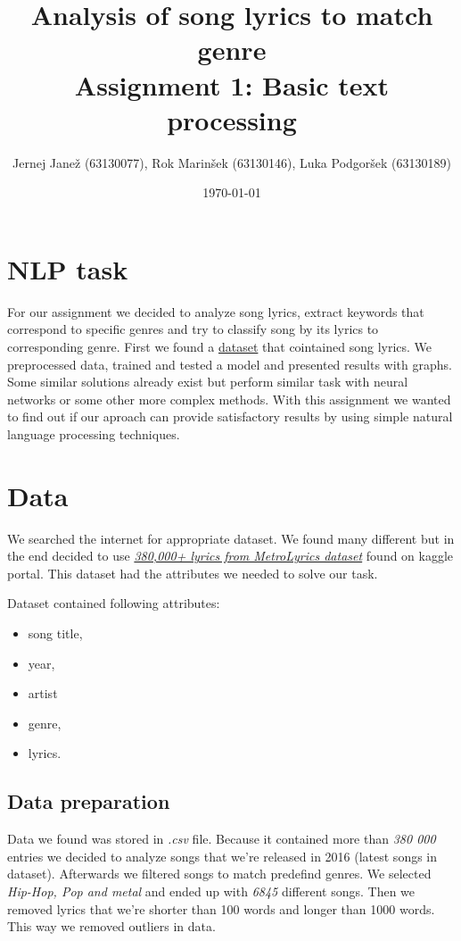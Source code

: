 \documentclass[a4paper,11pt]{article}
\title{%
Analysis of song lyrics to match genre \\
\large Assignment 1: Basic text processing}
\author{Jernej Janež (63130077), Rok Marinšek (63130146), Luka Podgoršek (63130189)}
\date{\today}
\begin{document}
\maketitle

\section{NLP task}
For our assignment we decided to analyze song lyrics, extract keywords that correspond to specific genres and try to classify song by its lyrics to corresponding genre. First we found a \href{https://www.kaggle.com/gyani95/380000-lyrics-from-metrolyrics}{dataset} that cointained song lyrics. We preprocessed data, trained and tested a model and presented results with graphs. Some similar solutions already exist but perform similar task with neural networks or some other more complex methods. With this assignment we wanted to find out if our aproach can provide satisfactory results by using simple natural language processing techniques.

\section{Data}
We searched the internet for appropriate dataset. We found many different but in the end decided to use \href{https://www.kaggle.com/gyani95/380000-lyrics-from-metrolyrics}{\textit{380,000+ lyrics from MetroLyrics dataset}} found on kaggle portal. This dataset had the attributes we needed to solve our task.

Dataset contained following attributes:
\begin{itemize}
\item song title,
\item year,
\item artist
\item genre,
\item lyrics.
\end{itemize}

\subsection{Data preparation}
Data we found was stored in \textit{.csv} file. Because it contained more than \textit{380 000} entries we decided to analyze songs that we're released in 2016 (latest songs in dataset). Afterwards we filtered songs to match predefind genres. We selected \textit{Hip-Hop, Pop  and metal} and ended up with \textit{6845} different songs. Then we removed lyrics that we're shorter than 100 words and longer than 1000 words. This way we removed outliers in data.
\end{document}
